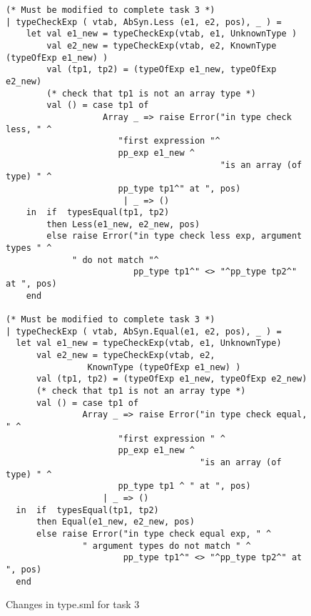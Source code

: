\documentclass[12pt,a4paper,english]{article}
\begin{document}
\begin{figure}[h]
\begin{lstlisting}
(* Must be modified to complete task 3 *)
| typeCheckExp ( vtab, AbSyn.Less (e1, e2, pos), _ ) =
    let val e1_new = typeCheckExp(vtab, e1, UnknownType )
        val e2_new = typeCheckExp(vtab, e2, KnownType (typeOfExp e1_new) )
        val (tp1, tp2) = (typeOfExp e1_new, typeOfExp e2_new)
        (* check that tp1 is not an array type *)
        val () = case tp1 of
                   Array _ => raise Error("in type check less, " ^
					  "first expression "^ 
					  pp_exp e1_new ^
                                          "is an array (of type) " ^
					  pp_type tp1^" at ", pos)
                       | _ => ()
    in  if  typesEqual(tp1, tp2)
        then Less(e1_new, e2_new, pos)
        else raise Error("in type check less exp, argument types " ^
			 " do not match "^
                         pp_type tp1^" <> "^pp_type tp2^" at ", pos)
    end

(* Must be modified to complete task 3 *)
| typeCheckExp ( vtab, AbSyn.Equal(e1, e2, pos), _ ) =
  let val e1_new = typeCheckExp(vtab, e1, UnknownType)
      val e2_new = typeCheckExp(vtab, e2, 
		   		KnownType (typeOfExp e1_new) )
      val (tp1, tp2) = (typeOfExp e1_new, typeOfExp e2_new)
      (* check that tp1 is not an array type *)
      val () = case tp1 of
               Array _ => raise Error("in type check equal, " ^
				      "first expression " ^
				      pp_exp e1_new ^
                                      "is an array (of type) " ^
				      pp_type tp1 ^ " at ", pos)
                   | _ => ()
  in  if  typesEqual(tp1, tp2)
      then Equal(e1_new, e2_new, pos)
      else raise Error("in type check equal exp, " ^
		       " argument types do not match " ^
                       pp_type tp1^" <> "^pp_type tp2^" at ", pos)
  end

\end{lstlisting}
\caption{Changes in type.sml for task 3}\end{figure}
\end{document}
